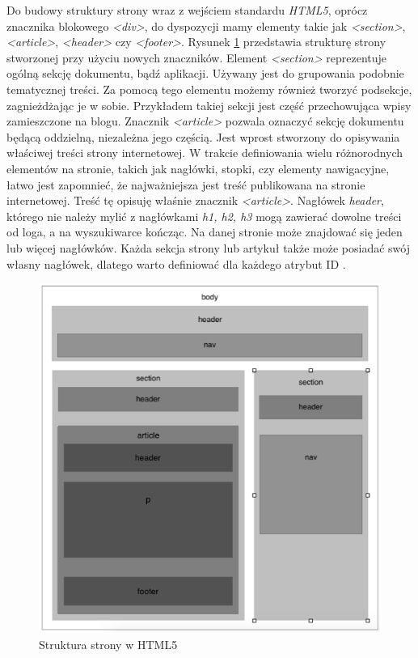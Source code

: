 \documentclass{iiuwb}
\begin{document}
Do budowy struktury strony wraz z wejściem standardu \textit{HTML5}, oprócz znacznika blokowego \textit{<div>}, do dyspozycji mamy elementy takie jak \textit{<section>}, \textit{<article>}, \textit{<header>} czy \textit{<footer>}. Rysunek \ref{fig:Struktura strony } przedstawia strukturę strony stworzonej przy użyciu nowych znaczników. Element \textit{<section>} reprezentuje ogólną sekcję dokumentu, bądź aplikacji. Używany jest do grupowania podobnie tematycznej treści. Za pomocą tego elementu możemy również tworzyć podsekcje, zagnieżdżając je w sobie. Przykładem takiej sekcji jest część przechowująca wpisy zamieszczone na blogu. Znacznik \textit{<article>} pozwala oznaczyć sekcję dokumentu będącą oddzielną, niezależna jego częścią. Jest wprost stworzony do opisywania właściwej treści strony internetowej. W trakcie definiowania wielu różnorodnych elementów na stronie, takich jak nagłówki, stopki, czy elementy nawigacyjne, łatwo jest zapomnieć, że najważniejsza jest treść publikowana na stronie internetowej. Treść tę opisuję właśnie znacznik \textit{<article>}. Nagłówek \textit{header}, którego nie należy mylić z nagłówkami \textit{h1, h2, h3} mogą zawierać dowolne treści od loga, a na wyszukiwarce kończąc. Na danej stronie może znajdować się jeden lub więcej nagłówków. Każda sekcja strony lub artykuł także może posiadać swój własny nagłówek, dlatego warto definiować dla każdego atrybut ID \cite{Hogan:2010:H}.
\begin{figure}[!th]
\centering
\includegraphics[scale=.6]{image/StrukturaStrony.png}
\caption{Struktura strony w HTML5}
\label{fig:Struktura strony }
\end{figure}
\end{document}
